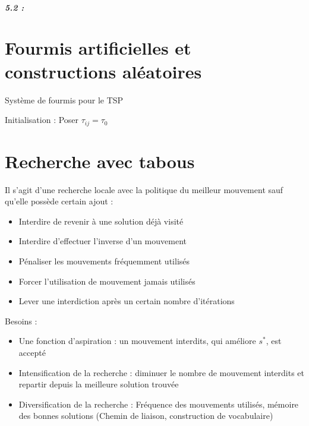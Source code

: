 \documentclass[11pt,a4paper]{report}
\begin{document}
\paragraph*{5.2 : } 

\chapter{Fourmis artificielles et constructions aléatoires}

\begin{algorithm}[H]
\caption{Système de fourmis pour le TSP}
Initialisation : Poser $\tau_{ij} = \tau_0$\;
\end{algorithm}

\chapter{Recherche avec tabous}

Il s'agit d'une recherche locale avec la politique du meilleur mouvement sauf qu'elle possède certain ajout :
\begin{itemize}
    \item Interdire de revenir à une solution déjà visité
    \item Interdire d'effectuer l'inverse d'un mouvement
    \item Pénaliser les mouvements fréquemment utilisés
    \item Forcer l'utilisation de mouvement jamais utilisés
    \item Lever une interdiction après un certain nombre d'itérations
\end{itemize}

Besoins :
\begin{itemize}
    \item Une fonction d'aspiration : un mouvement interdits, qui améliore $s^*$, est accepté
    \item Intensification de la recherche : diminuer le nombre de mouvement interdits et repartir depuis la meilleure solution trouvée
    \item Diversification de la recherche : Fréquence des mouvements utilisés, mémoire des bonnes solutions (Chemin de liaison, construction de vocabulaire)
\end{itemize}
\end{document}
